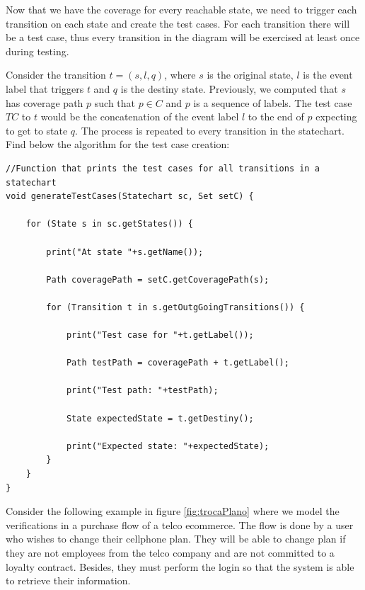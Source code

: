 Now that we have the coverage for every reachable state, we need to trigger each transition on each state and create the test cases. For each transition there will be a test case, thus every transition in the diagram will be exercised at least once during testing.

Consider the transition $t = (s,l,q)$, where $s$ is the original state, $l$ is the event label that triggers $t$ and $q$ is the destiny state. Previously, we computed that $s$ has coverage path $p$ such that $p \in C$ and $p$ is a sequence of labels. The test case $TC$ to $t$ would be the concatenation of the event label $l$ to the end of $p$ expecting to get to state $q$. The process is repeated to every transition in the statechart. Find below the algorithm for the test case creation:

\begin{lstlisting}[label={pseudocodeTestCase}]
//Function that prints the test cases for all transitions in a statechart
void generateTestCases(Statechart sc, Set setC) {

	for (State s in sc.getStates()) {
	
		print("At state "+s.getName());

		Path coveragePath = setC.getCoveragePath(s);

		for (Transition t in s.getOutgGoingTransitions()) {

			print("Test case for "+t.getLabel());

			Path testPath = coveragePath + t.getLabel();

			print("Test path: "+testPath);

			State expectedState = t.getDestiny();

			print("Expected state: "+expectedState);
		}
	}
}
\end{lstlisting}


Consider the following example in figure \ref{fig:trocaPlano} where we model the verifications in a purchase flow of a telco ecommerce. The flow is done by a user who wishes to change their cellphone plan. They will be able to change plan if they are not employees from the telco company and are not committed to a loyalty contract. Besides, they must perform the login so that the system is able to retrieve their information.

